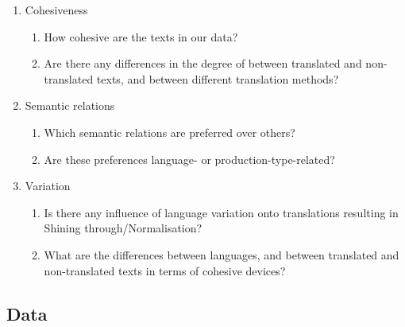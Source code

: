 \documentclass[output=paper]{langsci/langscibook.cls}
\begin{document}
\begin{enumerate}
\item Cohesiveness
\begin{enumerate}
\item How cohesive are the texts in our data?
\item Are there any differences in the degree of  between translated and non-translated texts, and between different translation methods?
\end{enumerate}
\item Semantic relations
\begin{enumerate}
\item Which semantic relations are preferred over others?
\item Are these preferences language- or production-type-related?
\end{enumerate}
\item Variation
\begin{enumerate}
\item Is there any influence of language variation onto translations resulting in Shining through/Normalisation?
\item What are the differences between languages, and between translated and non-translated texts in terms of cohesive devices?
\end{enumerate}
\end{enumerate}



\subsection{Data}\label{sec:data}
\end{document}
